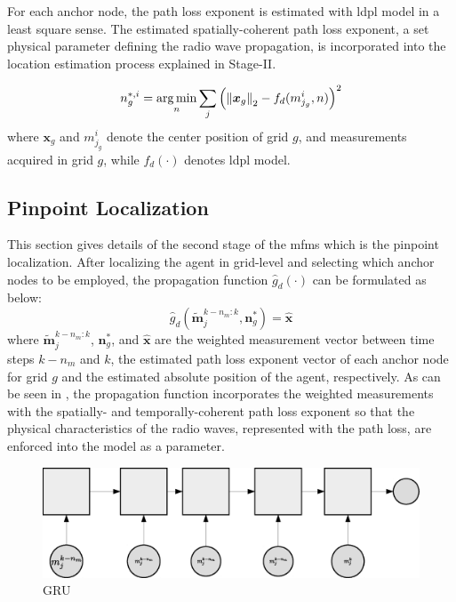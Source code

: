     For each anchor node, the path loss exponent is estimated with \gls{ldpl} model in a least square sense.
    The estimated spatially-coherent path loss exponent, a set physical parameter defining the radio wave propagation, is incorporated into the location estimation process explained in Stage-II\@.

    \begin{equation}
        n^{*,i}_g = \operatorname*{arg\,min}_n{\sum_j \left(\left\lVert\bm{x}_g\right\rVert_2 - f_d(m^i_{j_g},n)\right)^2}
    \end{equation}
    where $\bm{x}_g$ and $m^i_{j_g}$ denote the center position of grid $g$, and measurements acquired in grid $g$, while $f_d(\cdot)$ denotes \gls{ldpl} model.

    \subsection{Pinpoint Localization}
    This section gives details of the second stage of the \gls{mfms} which is the pinpoint localization.
    After localizing the agent in grid-level and selecting which anchor nodes to be employed, the propagation function $\hat{g}_d(\cdot)$ can be formulated as below:
    \begin{equation}
        \label{eq:propfunct}
        \hat{g}_d(\bm{\widetilde{m}}^{k-n_{m}:k}_j, \bm{n}^*_g)= \bm{\hat{x}}
    \end{equation}
    where $\bm{\widetilde{m}}^{k-n_{m}:k}_j$, $\bm{n}^*_g$, and $\bm{\hat{x}}$ are the weighted measurement vector between time steps $k-n_m$ and $k$, the estimated path loss exponent vector of each anchor node for grid $g$ and the estimated absolute position of the agent, respectively.
    As can be seen in , the propagation function incorporates the weighted measurements with the spatially- and temporally-coherent path loss exponent so that the physical characteristics of the radio waves, represented with the path loss, are enforced into the model as a parameter.

    \begin{figure}[thpb]
       \centering
       \includegraphics[width=\linewidth]{figures/gru.eps}
       \caption{\label{fig:gru}GRU}
    \end{figure}

